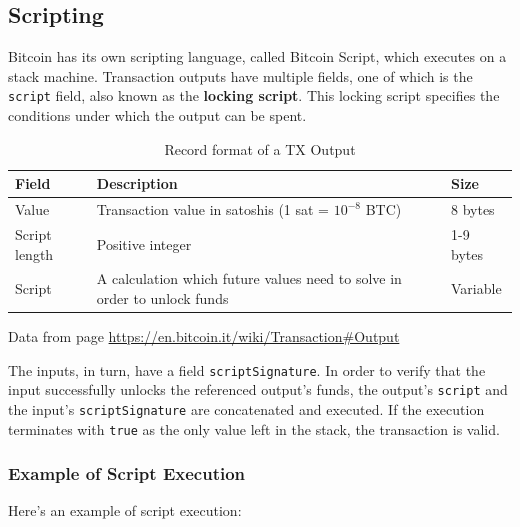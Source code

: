 \subsection{Scripting}\label{sec:scripting}
Bitcoin has its own scripting language, called Bitcoin Script, which executes on a stack machine.
Transaction outputs have multiple fields, one of which is the \texttt{script} field, also known as the
\textbf{locking script}.
This locking script specifies the conditions under which the output can be spent.
\begin{table}[htbp!]
  \small
  \centering
  \begin{tabularx}{\textwidth}{|l|X|X|}
    \hline
    \textbf{Field}          & \textbf{Description} & \textbf{Size} \\ \hline
    Value              & Transaction value in satoshis (1 sat = \(10^{-8}\) BTC) & 8 bytes \\ \hline
    Script length     & Positive integer                                          & 1-9 bytes               \\ \hline
    Script              & A calculation which future values need to solve in order to unlock funds & Variable
    \\ \hline
  \end{tabularx}
  \caption{Record format of a TX Output}
  \label{table:bitcoin_output_format}
  \begin{minipage}{\textwidth}
    \begin{center}
      \footnotesize{Data from \cite{BitcoinWiki} page \url{https://en.bitcoin.it/wiki/Transaction#Output}}
    \end{center}
  \end{minipage}
\end{table}

The inputs, in turn, have a field \texttt{scriptSignature}.
In order to verify that the input successfully unlocks the referenced output's funds, the output's
\texttt{script} and the input's \texttt{scriptSignature} are concatenated and executed.
If the execution terminates with \texttt{true} as the only value left in the stack, the transaction is valid.
\subsubsection{Example of Script Execution}
Here's an example of script execution:

